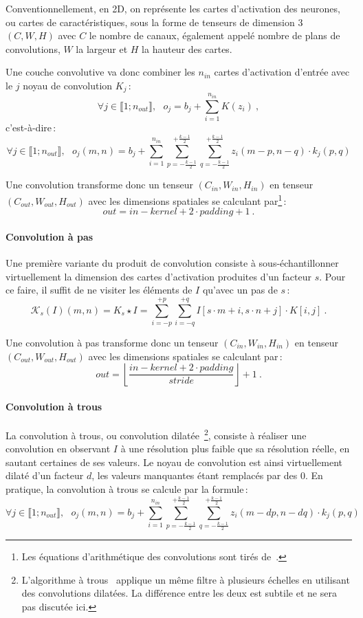 Conventionnellement, en 2D, on représente les cartes d'activation des neurones, ou cartes de caractéristiques, sous la forme de tenseurs de dimension 3 $(C, W, H)$ avec $C$ le nombre de canaux, également appelé nombre de plans de convolutions, $W$ la largeur et $H$ la hauteur des cartes.

Une couche convolutive va donc combiner les $n_{in}$ cartes d'activation d'entrée avec le $j$\ieme{} noyau de convolution $K_j$\,:
$$\forall j \in \llbracket 1;n_{out} \rrbracket,~~~o_j = b_j + \sum_{i=1}^{n_{in}} K(z_i)~,$$ c'est-à-dire\,:
$$\forall j \in \llbracket 1;n_{out} \rrbracket,~~~o_j(m, n) = b_j + \sum_{i=1}^{n_{in}} \sum_{p=-\frac{k-1}{2}}^{+\frac{k-1}{2}} \sum_{q=-\frac{k-1}{2}}^{+\frac{k-1}{2}} z_i(m - p, n - q) \cdot k_j(p, q)$$

Une convolution transforme donc un tenseur $(C_{in}, W_{in}, H_{in})$ en tenseur $(C_{out}, W_{out}, H_{out})$ avec les dimensions spatiales se calculant par\footnote{Les équations d'arithmétique des convolutions sont tirés de~\citet{dumoulin_guide_2016}.}\,:
$$\mathit{out} = \mathit{in} - \mathit{kernel} + 2\cdot \mathit{padding} + 1~.$$

\paragraph{Convolution à pas}

Une première variante du produit de convolution consiste à sous-échantillonner virtuellement la dimension des cartes d'activation produites d'un facteur $s$. Pour ce faire, il suffit de ne visiter les éléments de $I$ qu'avec un pas de $s$\,:
$$\mathcal{K}_s(I)(m,n) = K_s \star I = \sum_{i=-p}^{+p} \sum_{i=-q}^{+q} I[s \cdot m + i, s \cdot n + j] \cdot K[i, j]~.$$

Une convolution à pas transforme donc un tenseur $(C_{in}, W_{in}, H_{in})$ en tenseur $(C_{out}, W_{out}, H_{out})$ avec les dimensions spatiales se calculant par\,:
$$\mathit{out} = \left\lfloor \frac{\mathit{in} - \mathit{kernel} + 2 \cdot \mathit{padding}}{\mathit{stride}}\right\rfloor + 1~.$$

\paragraph{Convolution à trous}

La convolution à trous, ou convolution dilatée~\cite{yu_multi-scale_2015}\footnote{L'algorithme à trous~\cite{shensa_discrete_1992} applique un même filtre à plusieurs échelles en utilisant des convolutions dilatées. La différence entre les deux est subtile et ne sera pas discutée ici.}, consiste à réaliser une convolution en observant $I$ à une résolution plus faible que sa résolution réelle, en sautant certaines de ses valeurs. Le noyau de convolution est ainsi virtuellement dilaté d'un facteur $d$, les valeurs manquantes étant remplacés par des 0. En pratique, la convolution à trous se calcule par la formule\,:
$$\forall j \in \llbracket 1;n_{out} \rrbracket,~~~o_j(m, n) = b_j + \sum_{i=1}^{n_{in}} \sum_{p=-\frac{k-1}{2}}^{+\frac{k-1}{2}} \sum_{q=-\frac{k-1}{2}}^{+\frac{k-1}{2}} z_i(m - dp, n - dq) \cdot k_j(p, q)$$

